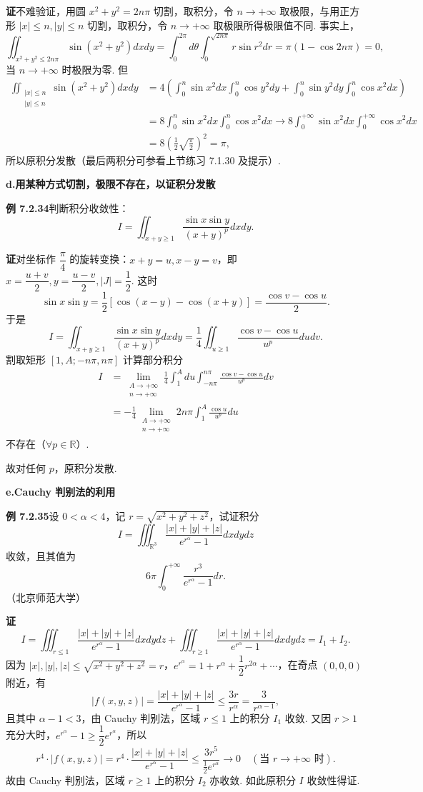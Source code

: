 \documentclass[UTF8, 12pt, fontset=fandol, oneside]{ctexart}
\begin{document}
\noindent\textbf{证}\quad 不难验证，用圆 $x^2+y^2=2n\pi$ 切割，取积分，令 $n\to+\infty$ 取极限，与用正方形 $|x|\le n,|y|\le n$ 切割，取积分，令 $n\to+\infty$ 取极限所得极限值不同. 事实上，
\[
\iint_{x^2+y^2\le2n\pi}\sin(x^2+y^2)dxdy
=\int_0^{2\pi}d\theta\int_0^{\sqrt{2n\pi}}r\sin r^2dr
=\pi(1-\cos2n\pi)=0,
\]
当 $n\to+\infty$ 时极限为零. 但
\[
\begin{aligned}
\iint_{\substack{|x|\le n\\|y|\le n}}\sin(x^2+y^2)dxdy
&=4\left(\int_0^n\sin x^2dx\int_0^n\cos y^2dy
+\int_0^n\sin y^2dy\int_0^n\cos x^2dx\right)\\
&=8\int_0^n\sin x^2dx\int_0^n\cos x^2dx
\to8\int_0^{+\infty}\sin x^2dx\int_0^{+\infty}\cos x^2dx\\
&=8\left(\frac12\sqrt{\frac\pi2}\right)^2=\pi,
\end{aligned}
\]
所以原积分发散（最后两积分可参看上节练习 7.1.30 及提示）.

\noindent\textbf{d.\quad 用某种方式切割，极限不存在，以证积分发散}

\noindent\textbf{例 7.2.34}\quad 判断积分收敛性：
\[
I=\iint_{x+y\ge1}\frac{\sin x\sin y}{(x+y)^p}dxdy.
\]

\noindent\textbf{证}\quad 对坐标作 $\dfrac\pi4$ 的旋转变换：$x+y=u,x-y=v$，即 $x=\dfrac{u+v}2,y=\dfrac{u-v}2,|J|=\dfrac12$. 这时
\[
\sin x\sin y=\frac12[\cos(x-y)-\cos(x+y)]
=\frac{\cos v-\cos u}2.
\]
于是
\[
I=\iint_{x+y\ge1}\frac{\sin x\sin y}{(x+y)^p}dxdy
=\frac14\iint_{u\ge1}\frac{\cos v-\cos u}{u^p}dudv.
\]
割取矩形 $[1,A;-n\pi,n\pi]$ 计算部分积分
\[
\begin{aligned}
I&=\lim_{\substack{A\to+\infty\\ n\to+\infty}}
\frac14\int_1^Adu\int_{-n\pi}^{n\pi}\frac{\cos v-\cos u}{u^p}dv\\
&=-\frac14\lim_{\substack{A\to+\infty\\ n\to+\infty}}
2n\pi\int_1^A\frac{\cos u}{u^p}du
\end{aligned}
\]
不存在（$\forall p\in\mathbb R$）.

故对任何 $p$，原积分发散.

\noindent\textbf{e.\quad Cauchy 判别法的利用}

\noindent\textbf{例 7.2.35}\quad 设 $0<\alpha<4$，记 $r=\sqrt{x^2+y^2+z^2}$，试证积分
\[
I=\iiint_{\mathbb R^3}\frac{|x|+|y|+|z|}{e^{r^\alpha}-1}dxdydz
\]
收敛，且其值为
\[
6\pi\int_0^{+\infty}\frac{r^3}{e^{r^\alpha}-1}dr.
\]
（北京师范大学）

\noindent\textbf{证}\quad
\[
I=\iiint_{r\le1}\frac{|x|+|y|+|z|}{e^{r^\alpha}-1}dxdydz
+\iiint_{r\ge1}\frac{|x|+|y|+|z|}{e^{r^\alpha}-1}dxdydz
=I_1+I_2.
\]
因为 $|x|,|y|,|z|\le\sqrt{x^2+y^2+z^2}=r$，$e^{r^\alpha}=1+r^\alpha+\dfrac12r^{2\alpha}+\cdots$，在奇点 $(0,0,0)$ 附近，有
\[
|f(x,y,z)|=\frac{|x|+|y|+|z|}{e^{r^\alpha}-1}
\le\frac{3r}{r^\alpha}=\frac3{r^{\alpha-1}},
\]
且其中 $\alpha-1<3$，由 Cauchy 判别法，区域 $r\le1$ 上的积分 $I_1$ 收敛. 又因 $r>1$ 充分大时，$e^{r^\alpha}-1\ge\dfrac12e^{r^\alpha}$，所以
\[
r^4\cdot |f(x,y,z)|
=r^4\cdot\frac{|x|+|y|+|z|}{e^{r^\alpha}-1}
\le\frac{3r^5}{\frac12e^{r^\alpha}}\to0\quad(\text{当 }r\to+\infty\text{ 时}).
\]
故由 Cauchy 判别法，区域 $r\ge1$ 上的积分 $I_2$ 亦收敛. 如此原积分 $I$ 收敛性得证.
\end{document}
